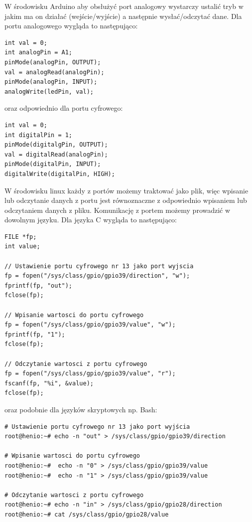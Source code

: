 \documentclass{xmgr}
\begin{document}
W środowisku Arduino aby obsłużyć port analogowy wystarczy ustalić tryb w jakim ma on działać (wejście/wyjście) a następnie wysłać/odczytać dane. Dla portu analogowego wygląda to następująco:

\begin{lstlisting}[label=bot-dirs-alg,caption=Obsługa portu analogowego w środowisku Arduino]
int val = 0;
int analogPin = A1;	
pinMode(analogPin, OUTPUT);
val = analogRead(analogPin);
pinMode(analogPin, INPUT);
analogWrite(ledPin, val);
\end{lstlisting}

oraz odpowiednio dla portu cyfrowego:
\begin{lstlisting}[label=bot-dirs-alg,caption=Obsługa portu cyfrowego w środowisku Arduino]
int val = 0;
int digitalPin = 1;	
pinMode(digitalgPin, OUTPUT);
val = digitalRead(analogPin);
pinMode(digitalPin, INPUT);
digitalWrite(digitalPin, HIGH);
\end{lstlisting}

W środowisku linux każdy z portów możemy traktować jako plik, więc wpisanie lub odczytanie danych z portu jest równoznaczne z odpowiednio wpisaniem lub odczytaniem danych z pliku. Komunikację z portem możemy prowadzić w dowolnym języku. Dla języka C wygląda to następująco:

\begin{lstlisting}[label=bot-dirs-alg,caption=Obsługa portu cyfrowego w środowisku Linux (język C)]
FILE *fp;
int value;

// Ustawienie portu cyfrowego nr 13 jako port wyjscia
fp = fopen("/sys/class/gpio/gpio39/direction", "w");
fprintf(fp, "out");
fclose(fp);

// Wpisanie wartosci do portu cyfrowego
fp = fopen("/sys/class/gpio/gpio39/value", "w");
fprintf(fp, "1");
fclose(fp);

// Odczytanie wartosci z portu cyfrowego
fp = fopen("/sys/class/gpio/gpio39/value", "r");
fscanf(fp, "%i", &value);
fclose(fp);
\end{lstlisting}

oraz podobnie dla języków skryptowych np. Bash:

\begin{lstlisting}[label=bot-dirs-alg,caption=Obsługa portu cyfrowego w środowisku Linux (bash)]
# Ustawienie portu cyfrowego nr 13 jako port wyjścia
root@henio:~# echo -n "out" > /sys/class/gpio/gpio39/direction

# Wpisanie wartosci do portu cyfrowego
root@henio:~#  echo -n "0" > /sys/class/gpio/gpio39/value
root@henio:~#  echo -n "1" > /sys/class/gpio/gpio39/value

# Odczytanie wartosci z portu cyfrowego
root@henio:~# echo -n "in" > /sys/class/gpio/gpio28/direction
root@henio:~# cat /sys/class/gpio/gpio28/value
\end{lstlisting}
\end{document}
